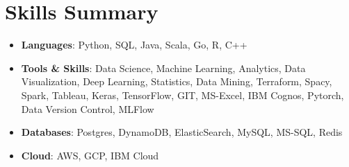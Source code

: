 \documentclass[letterpaper,10.8pt]{article}
\newcommand{\resumeItem}[3]{
  \item\small{
    \textbf{#1}{: #2}{\\
     \textit{\small{Technology Used: }}\small#3\vspace{-2pt}}
  }
}
\newcommand{\resumeSubItem}[2]{
  \item\small{
    \textbf{#1}{: #2\vspace{-3pt}}
  }
}
\newcommand{\resumeSubHeadingListStart}{\begin{itemize}[leftmargin=*]}
\newcommand{\resumeSubHeadingListEnd}{\end{itemize}}
\newcommand{\resumeItemListStart}{\begin{itemize}}
\newcommand{\resumeItemListEnd}{\end{itemize}\vspace{-5pt}}
\begin{document}
\section{Skills Summary}
	\resumeSubHeadingListStart
	\resumeSubItem{Languages}{Python, SQL, Java, Scala, Go, R, C++}
	\resumeSubItem{Tools \& Skills}{Data Science, Machine Learning, Analytics, Data Visualization, Deep Learning, Statistics, Data Mining, Terraform, Spacy, Spark, Tableau, Keras, TensorFlow, GIT, MS-Excel, IBM Cognos, Pytorch, Data Version Control, MLFlow}
	\resumeSubItem{Databases}{ Postgres, DynamoDB, ElasticSearch, MySQL, MS-SQL, Redis }
	\resumeSubItem{Cloud}{AWS, GCP, IBM Cloud }
	
\resumeSubHeadingListEnd

\end{document}
